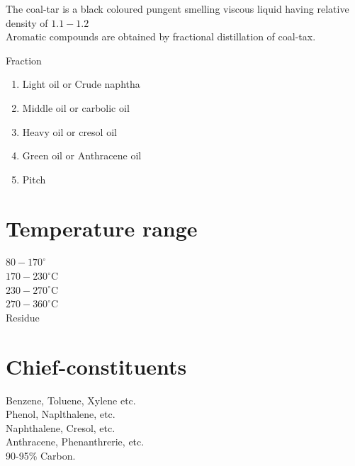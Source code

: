 \documentclass[10pt]{article}
\begin{document}
The coal-tar is a black coloured pungent smelling viscous liquid having relative density of $1.1-1.2$\\
Aromatic compounds are obtained by fractional distillation of coal-tax.

Fraction

\begin{enumerate}
  \item Light oil or Crude naphtha
  \item Middle oil or carbolic oil
  \item Heavy oil or cresol oil
  \item Green oil or Anthracene oil
  \item Pitch
\end{enumerate}

\section*{Temperature range}
$80-170^{\circ}$\\
$170-230^{\circ} \mathrm{C}$\\
$230-270^{\circ} \mathrm{C}$\\
$270-360^{\circ} \mathrm{C}$\\
Residue

\section*{Chief-constituents}
Benzene, Toluene, Xylene etc.\\
Phenol, Naplthalene, etc.\\
Naphthalene, Cresol, etc.\\
Anthracene, Phenanthrerie, etc.\\
90-95\% Carbon.
\end{document}
